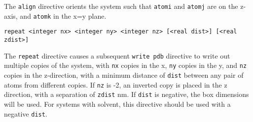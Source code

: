 The \verb+align+ directive orients the system such that
\verb+atomi+ and \verb+atomj+ are on the z-axis, and \verb+atomk+
in the x=y plane.

\begin{verbatim}
repeat <integer nx> <integer ny> <integer nz> [<real dist>] [<real zdist>]
\end{verbatim}

The \verb+repeat+ directive causes a subsequent \verb+write pdb+
directive to write out multiple copies of the system, with \verb+nx+
copies in the x, \verb+ny+ copies in the y, and \verb+nz+ copies in 
the z-direction, with a minimum distance of \verb+dist+ between any
pair of atoms from different copies. If \verb+nz+ is -2, an inverted
copy is placed in the z direction, with a separation of \verb+zdist+ nm. 
If \verb+dist+ is negative, the box dimensions will be used. 
For systems with solvent, this directive should be used with a negative 
\verb+dist+.
